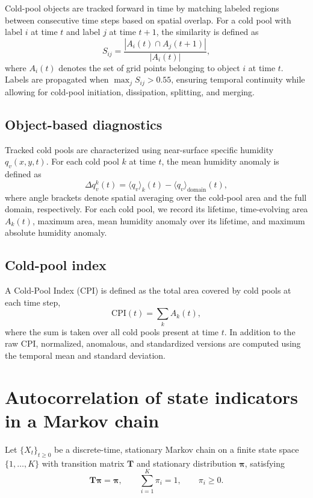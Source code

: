\documentclass[
    aps,
    prl,
    reprint,
    superscriptaddress,
    amsmath,amssymb,
    nofootinbib,
    floatfix
]{revtex4-2}
\begin{document}
Cold-pool objects are tracked forward in time by matching labeled regions between consecutive time
steps based on spatial overlap. For a cold pool with label $i$ at time $t$ and label $j$ at time $t+1$,
the similarity is defined as
\begin{equation}
S_{ij} = \frac{|A_i(t) \cap A_j(t+1)|}{|A_i(t)|},
\end{equation}
where $A_i(t)$ denotes the set of grid points belonging to object $i$ at time $t$. Labels are
propagated when $\max_j S_{ij} > 0.55$, ensuring temporal continuity while allowing for cold-pool
initiation, dissipation, splitting, and merging.

\subsection*{Object-based diagnostics}

Tracked cold pools are characterized using near-surface specific humidity $q_v(x,y,t)$. For each cold
pool $k$ at time $t$, the mean humidity anomaly is defined as
\begin{equation}
\Delta q_v^k(t) = \langle q_v \rangle_k(t) - \langle q_v \rangle_{\mathrm{domain}}(t),
\end{equation}
where angle brackets denote spatial averaging over the cold-pool area and the full domain,
respectively. For each cold pool, we record its lifetime, time-evolving area $A_k(t)$, maximum area,
mean humidity anomaly over its lifetime, and maximum absolute humidity anomaly.

\subsection*{Cold-pool index}

A Cold-Pool Index (CPI) is defined as the total area covered by cold pools at each time step,
\begin{equation}
\mathrm{CPI}(t) = \sum_k A_k(t),
\end{equation}
where the sum is taken over all cold pools present at time $t$. In addition to the raw CPI, normalized,
anomalous, and standardized versions are computed using the temporal mean and standard deviation.


\section{Autocorrelation of state indicators in a Markov chain}

Let $\{X_t\}_{t\ge 0}$ be a discrete-time, stationary Markov chain on a finite
state space $\{1,\dots,K\}$ with transition matrix $\mathbf{T}$ and stationary
distribution $\boldsymbol{\pi}$, satisfying
\begin{equation}
    \mathbf{T}\boldsymbol{\pi} = \boldsymbol{\pi},
    \qquad
    \sum_{i=1}^K \pi_i = 1,
    \qquad
    \pi_i \ge 0.
\end{equation}
\end{document}
